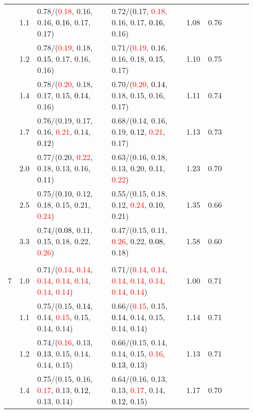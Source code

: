 \documentclass[10pt,a4paper]{report}
\begin{document}
\begin{table}[!htbp]
\begin{center}
{\begin{tabular}{ccllccccc}
			&1.1&0.78/(\textcolor{red}{0.18}, 0.16, 0.16, \textcolor{black}{0.16}, 0.17, 0.17)&0.72/(0.17, \textcolor{red}{0.18}, 0.16, 0.17, \textcolor{black}{0.16}, 0.16)&1.08&0.76\\
			&1.2&0.78/(\textcolor{red}{0.19}, 0.18, \textcolor{black}{0.15}, 0.17, 0.16, 0.16)&0.71/(\textcolor{red}{0.19}, 0.16, 0.16, 0.18, \textcolor{black}{0.15}, 0.17)&1.10&0.75\\
			&1.4&0.78/(\textcolor{red}{0.20}, 0.18, 0.17, 0.15, \textcolor{black}{0.14}, 0.16)&0.70/(\textcolor{red}{0.20}, \textcolor{black}{0.14}, 0.18, 0.15, 0.16, 0.17)&1.11&0.74\\
			&1.7&0.76/(0.19, 0.17, 0.16, \textcolor{red}{0.21}, 0.14, \textcolor{black}{0.12})&0.68/(0.14, 0.16, 0.19, \textcolor{black}{0.12}, \textcolor{red}{0.21}, 0.17)&1.13&0.73\\
			&2.0&0.77/(0.20, \textcolor{red}{0.22}, 0.18, 0.13, 0.16, \textcolor{black}{0.11})&0.63/(0.16, 0.18, 0.13, 0.20, \textcolor{black}{0.11}, \textcolor{red}{0.22})&1.23&0.70\\
			&2.5&0.75/(\textcolor{black}{0.10}, 0.12, 0.18, 0.15, 0.21, \textcolor{red}{0.24})&0.55/(0.15, 0.18, 0.12, \textcolor{red}{0.24}, \textcolor{black}{0.10}, 0.21)&1.35&0.66\\
			&3.3&0.74/(\textcolor{black}{0.08}, 0.11, 0.15, 0.18, 0.22, \textcolor{red}{0.26})&0.47/(0.15, 0.11, \textcolor{red}{0.26}, 0.22, \textcolor{black}{0.08}, 0.18)&1.58&0.60\\
			&&&&\\
			7			&1.0&0.71/(\textcolor{red}{0.14}, \textcolor{red}{0.14}, \textcolor{red}{0.14}, \textcolor{red}{0.14}, \textcolor{red}{0.14}, \textcolor{red}{0.14}, \textcolor{red}{0.14})&0.71/(\textcolor{red}{0.14}, \textcolor{red}{0.14}, \textcolor{red}{0.14}, \textcolor{red}{0.14}, \textcolor{red}{0.14}, \textcolor{red}{0.14}, \textcolor{red}{0.14})&1.00&0.71\\
			&1.1&0.75/(0.15, \textcolor{black}{0.14}, 0.14, \textcolor{red}{0.15}, 0.15, 0.14, 0.14)&0.66/(\textcolor{red}{0.15}, 0.15, \textcolor{black}{0.14}, 0.14, 0.15, 0.14, 0.14)&1.14&0.71\\
			&1.2&0.74/(\textcolor{red}{0.16}, 0.13, \textcolor{black}{0.13}, 0.15, 0.14, 0.14, 0.15)&0.66/(0.15, 0.14, 0.14, 0.15, \textcolor{red}{0.16}, \textcolor{black}{0.13}, 0.13)&1.13&0.71\\
			&1.4&0.75/(0.15, 0.16, \textcolor{red}{0.17}, 0.13, \textcolor{black}{0.12}, 0.13, 0.14)&0.64/(0.16, 0.13, 0.13, \textcolor{red}{0.17}, 0.14, \textcolor{black}{0.12}, 0.15)&1.17&0.70\\

\end{tabular}}
\end{center}
\end{table}
\end{document}
